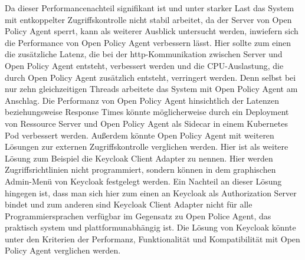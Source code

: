 Da dieser Performancenachteil signifikant ist und unter starker Last das System mit entkoppelter Zugriffskontrolle nicht stabil arbeitet, da der Server von Open Policy Agent sperrt, kann als weiterer Ausblick untersucht werden, inwiefern sich die Performance von Open Policy Agent verbessern lässt. Hier sollte zum einen die zusätzliche Latenz, die bei der http-Kommunikation zwischen Server und Open Policy Agent entsteht, verbessert werden und die CPU-Auslastung, die durch Open Policy Agent zusätzlich entsteht, verringert werden. Denn selbst bei nur zehn gleichzeitigen Threads arbeitete das System mit Open Policy Agent am Anschlag. Die Performanz von Open Policy Agent hinsichtlich der Latenzen beziehungsweise Response Times könnte möglicherweise durch ein Deployment von Ressource Server und Open Policy Agent als Sidecar in einem Kubernetes Pod verbessert werden. Außerdem könnte Open Policy Agent mit weiteren Lösungen zur externen Zugriffskontrolle verglichen werden. Hier ist als weitere Lösung zum Beispiel die Keycloak Client Adapter zu nennen. Hier werden Zugriffsrichtlinien nicht programmiert, sondern können in dem graphischen Admin-Menü von Keycloak festgelegt werden. Ein Nachteil an dieser Lösung hingegen ist, dass man sich hier zum einen an Keycloak als Authorization Server bindet und zum anderen sind Keycloak Client Adapter nicht für alle Programmiersprachen verfügbar im Gegensatz zu Open Police Agent, das praktisch system und plattformunabhängig ist. Die Lösung von Keycloak könnte unter den Kriterien der Performanz, Funktionalität und Kompatibilität mit Open Policy Agent verglichen werden.

